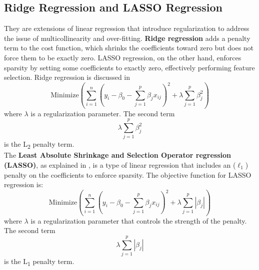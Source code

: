 \documentclass{book}
\numberwithin{equation}{section}
\numberwithin{figure}{section}
\begin{document}
\subsection{Ridge Regression and LASSO Regression}
\label{ridge and lasso}
\vspace{-5mm} %
They are extensions of linear regression that introduce regularization to address the issue of multicollinearity and over-fitting. \textbf{Ridge regression} adds a penalty term to the cost function, which shrinks the coefficients toward zero but does not force them to be exactly zero. LASSO regression, on the other hand, enforces sparsity by setting some coefficients to exactly zero, effectively performing feature selection. Ridge regression is discussed in \cite{ridge_regression}
\begin{equation}
\text{Minimize} \left( \sum_{i=1}^{n} (y_i - \beta_0 - \sum_{j=1}^{p} \beta_j x_{ij})^2 + \lambda \sum_{j=1}^{p} \beta_j^2 \right)
\end{equation}
where \(\lambda\) is a regularization parameter.
The second term \[\lambda \sum_{j=1}^{p} \beta_j^2\]
is the L\textsubscript{2} penalty term.\\
The \textbf{Least Absolute Shrinkage and Selection Operator regression (LASSO)}, as explained in \cite{LASSO_regression}, is a type of linear regression that includes an (\(\ell_1\)) penalty on the coefficients to enforce sparsity. The objective function for LASSO regression is:
\begin{equation}
\text{Minimize} \left( \sum_{i=1}^{n} (y_i - \beta_0 - \sum_{j=1}^{p} \beta_j x_{ij})^2 + \lambda \sum_{j=1}^{p} |\beta_j| \right)
\end{equation}
where \(\lambda\) is a regularization parameter that controls the strength of the penalty.\\
The second term 
\[
\lambda \sum_{j=1}^{p} |\beta_j|
\]
is the L\textsubscript{1} penalty term.\\
\vspace{-5mm} %
\end{document}
